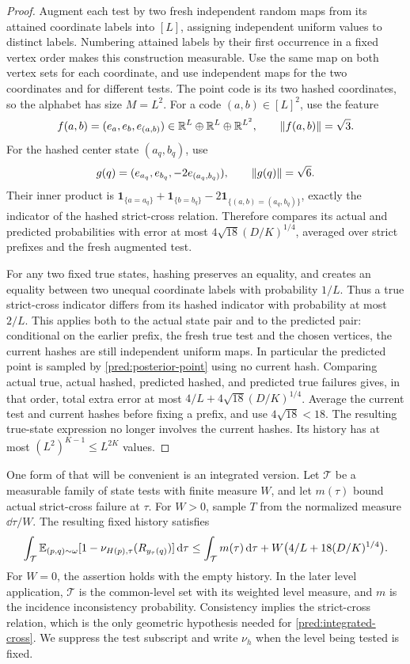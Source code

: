 \begin{proof}
Augment each test by two fresh independent random maps from its attained
coordinate labels into \([L]\), assigning independent uniform values to
distinct labels.  Numbering attained labels by their first occurrence in a
fixed vertex order makes this construction measurable.  Use the same map
on both vertex sets for each coordinate,
and use independent maps for the two coordinates and for different tests.
The point code is its two hashed coordinates, so the alphabet has size
\(M=L^2\).  For a code \((a,b)\in[L]^2\), use the feature
\[
 f(a,b)=(e_a,e_b,e_{(a,b)})\in\mathbb R^L\oplus\mathbb R^L\oplus\mathbb R^{L^2},
 \qquad \lVert f(a,b)\rVert=\sqrt3.
\]
For the hashed center state \((a_q,b_q)\), use
\[
 g(q)=(e_{a_q},e_{b_q},-2e_{(a_q,b_q)}),
 \qquad \lVert g(q)\rVert=\sqrt6.
\]
Their inner product is
\(\mathbf1_{\{a=a_q\}}+\mathbf1_{\{b=b_q\}}
-2\mathbf1_{\{(a,b)=(a_q,b_q)\}}\), exactly the indicator of the hashed
strict-cross relation.  Therefore  compares its actual and
predicted probabilities with error at most
\(4\sqrt{18}(D/K)^{1/4}\), averaged over strict prefixes and the fresh
augmented test.

For any two fixed true states, hashing preserves an equality, and creates
an equality between two unequal coordinate labels with probability \(1/L\).
Thus a true strict-cross indicator differs from its hashed indicator with
probability at most \(2/L\).  This applies both to the actual state pair and
to the predicted pair: conditional on the earlier prefix, the fresh true
test and the chosen vertices, the current hashes are still independent
uniform maps.  In particular the predicted point is sampled by
\eqref{pred:posterior-point} using no current hash.  Comparing actual true,
actual hashed, predicted hashed, and predicted true failures gives, in that
order, total extra error at most
\(4/L+4\sqrt{18}(D/K)^{1/4}\).  Average the current test and current hashes
before fixing a prefix, and use \(4\sqrt{18}<18\).  The resulting true-state
expression no longer involves the current hashes.  Its history has at most
\((L^2)^{K-1}\le L^{2K}\) values.
\end{proof}

One form of  that will be convenient is an integrated
version.  Let \(\mathcal T\) be a measurable family of state tests with finite
measure \(W\), and let \(m(\tau)\) bound actual strict-cross failure at
\(\tau\).  For \(W>0\), sample \(T\) from the normalized measure
\(\dd\tau/W\).  The resulting fixed history satisfies
\begin{equation}\label{pred:integrated-cross}
 \int_{\mathcal T}\mathbb E_{(p,q)\sim\omega}
 [1-\nu_{H(p),\tau}(R_{y_\tau(q)})]\,\mathrm d\tau
 \le\int_{\mathcal T}m(\tau)\,\mathrm d\tau
       +W\bigl(4/L+18(D/K)^{1/4}\bigr).
\end{equation}
For \(W=0\), the assertion holds with the empty history.  In the later level
application, \(\mathcal T\) is the common-level set with its weighted level
measure, and \(m\) is the incidence inconsistency probability.  Consistency
implies the strict-cross relation, which is the only geometric hypothesis
needed for \eqref{pred:integrated-cross}.  We suppress the test subscript and
write \(\nu_h\) when the level being tested is fixed.


